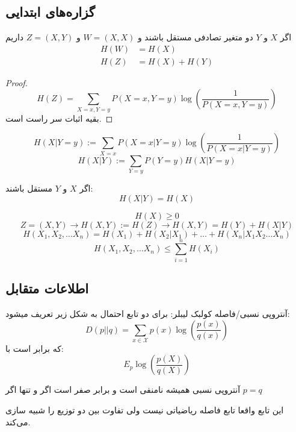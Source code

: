 \subsection{گزاره‌های ابتدایی}
\begin{theorem}
اگر
$X$
و
$Y$
دو متغیر تصادفی مستقل باشند و
$W = (X, X)$
و
$Z = (X, Y)$
داریم
\begin{align*}
    H(W) &= H(X) \\
    H(Z) &= H(X) + H(Y)
\end{align*}
\end{theorem}
\begin{proof}
	$$H(Z) = \sum_{X = x, Y = y} P(X = x, Y = y) \log(\frac{1}{ P(X = x, Y = y)})$$
بقیه اثبات سر راست است.
\end{proof}
\begin{definition}
$$H(X | Y = y) := \sum_{X = x} P(X = x| Y = y) \log(\frac{1}{P(X = x| Y = y)})$$
$$H(X|Y) := \sum_{Y = y} P(Y = y) H(X | Y = y)$$
\end{definition}

\begin{theorem}
اگر
$X$
و
$Y$
مستقل باشند:
$$H(X|Y) = H(X)$$
\end{theorem}
\begin{theorem}
$$H(X) \geq 0$$
$$Z = (X, Y) \rightarrow H(X, Y) := H(Z) \rightarrow H(X, Y) = H(Y) + H(X|Y) $$
$$H(X_1, X_2, \dots X_n) = H(X_1) + H(X_2 | X_1) + \dots + H(X_n | X_1 X_2 \dots X_n)$$
$$H(X_1, X_2, \dots X_n) \leq \sum_{i = 1}^{n} H(X_i)$$
\end{theorem}
\subsection{اطلاعات متقابل}
\begin{definition}
آنتروپی نسبی/فاصله کولبک لیبلر: برای دو تابع احتمال به شکل زیر تعریف میشود:
$$
D(p||q) = \sum_{x \in \mathcal{X}} p(x) \log(\dfrac{p(x)}{q(x)})
$$
که برابر است با:
$$E_p \log(\dfrac{p(X)}{q(X)})$$
\end{definition}
\begin{theorem}
آنتروپی نسبی همیشه نامنفی است و برابر صفر است اگر و تنها اگر
$p = q$
\end{theorem}
این تابع واقعا تابع فاصله ریاضیاتی نیست ولی تفاوت بین دو توزیع را شبیه سازی می‌کند.

